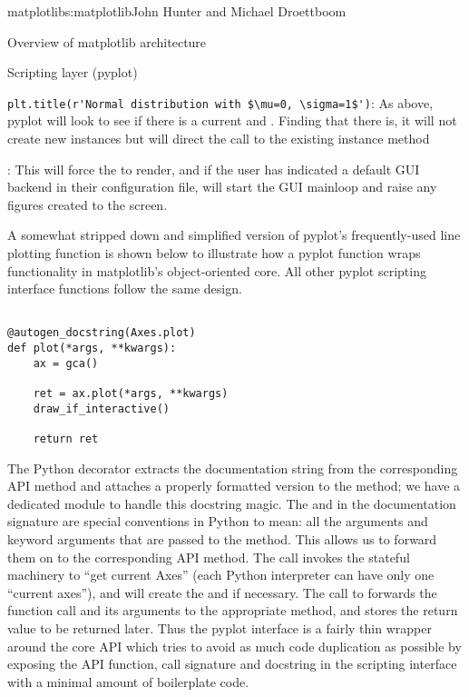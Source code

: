 \begin{aosachapter}{matplotlib}{s:matplotlib}{John Hunter and Michael Droettboom}
\begin{aosasect1}{Overview of matplotlib architecture}
\begin{aosasect2}{Scripting layer (pyplot)}
\begin{aosaitemize}
\item \verb+plt.title(r'Normal distribution with $\mu=0, \sigma=1$')+:
  As above, pyplot will look to see if there is a
  current  and .  Finding that there is, it
  will not create new instances but will direct the call to the
  existing  instance method 

\item {}: This will force the  to render,
  and if the user has indicated a default GUI backend in their
  configuration file, will start the GUI mainloop and raise any
  figures created to the screen.

\end{aosaitemize}

A somewhat stripped down and simplified version of pyplot's
frequently-used line plotting function 
is shown below to illustrate how a pyplot function wraps functionality
in matplotlib's object-oriented core.  All other pyplot scripting
interface functions follow the same design.

\begin{verbatim}

@autogen_docstring(Axes.plot)
def plot(*args, **kwargs):
    ax = gca()

    ret = ax.plot(*args, **kwargs)
    draw_if_interactive()

    return ret

\end{verbatim}

The Python decorator  extracts
the documentation string from the corresponding API method and
attaches a properly formatted version to the 
method; we have a dedicated module  to
handle this docstring magic.  The  and  in
the documentation signature are special conventions in Python to mean:
all the arguments and keyword arguments that are passed to the method.
This allows us to forward them on to the corresponding API method.
The call  invokes the stateful machinery to ``get
current Axes'' (each Python interpreter can have only one ``current
axes''), and will create the  and  if
necessary.  The call to  forwards
the function call and its arguments to the appropriate 
method, and stores the return value to be returned later.  Thus the
pyplot interface is a fairly thin wrapper around the core
 API which tries to avoid as much code duplication as
possible by exposing the API function, call signature and docstring in
the scripting interface with a minimal amount of boilerplate code.



\end{aosasect2}
\end{aosasect1}
\end{aosachapter}

